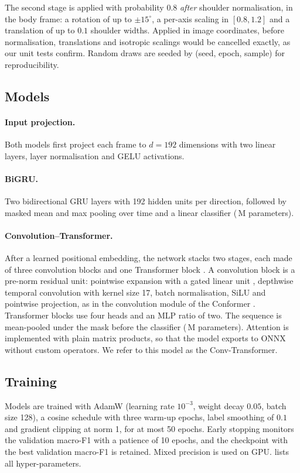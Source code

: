 The second stage is applied with probability $0.8$ \emph{after} shoulder normalisation, in the
body frame: a rotation of up to $\pm15^\circ$, a per-axis scaling in $[0.8,1.2]$ and a translation
of up to $0.1$ shoulder widths. Applied in image coordinates, before normalisation, translations
and isotropic scalings would be cancelled exactly, as our unit tests confirm. Random draws are
seeded by (seed, epoch, sample) for reproducibility.

\subsection{Models}

\paragraph{Input projection.} Both models first project each frame to $d=192$ dimensions with two
linear layers, layer normalisation and GELU activations.

\paragraph{BiGRU.} Two bidirectional GRU layers \citep{cho2014gru} with 192 hidden units per
direction, followed by masked mean and max pooling over time and a linear classifier
(\numGruParams{}\,M parameters).

\paragraph{Convolution--Transformer.} After a learned positional embedding, the network stacks two
stages, each made of three convolution blocks and one Transformer block
\citep{vaswani2017attention}. A convolution block is a pre-norm residual unit: pointwise expansion
with a gated linear unit \citep{dauphin2017glu}, depthwise temporal convolution with kernel size 17,
batch normalisation, SiLU and pointwise projection, as in the convolution module of the Conformer
\citep{gulati2020conformer}. Transformer blocks use four heads and an MLP ratio of two. The
sequence is mean-pooled under the mask before the classifier (\numTrParams{}\,M parameters).
Attention is implemented with plain matrix products, so that the model exports to ONNX without
custom operators. We refer to this model as the Conv-Transformer.

\subsection{Training}
Models are trained with AdamW \citep{loshchilov2019adamw} (learning rate $10^{-3}$, weight decay
$0.05$, batch size 128), a cosine schedule with three warm-up epochs, label smoothing of $0.1$
\citep{szegedy2016rethinking} and gradient clipping at norm 1, for at most 50 epochs. Early stopping
monitors the validation macro-F1 with a patience of 10 epochs, and the checkpoint with the best
validation macro-F1 is retained. Mixed precision is used on GPU.  lists all
hyper-parameters.

